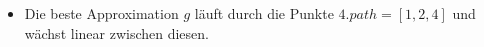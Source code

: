 \documentclass[a4paper]{scrartcl}
\begin{document}
\begin{enumerate}[(a)]
\begin{itemize}
\begin{itemize}
                \end{itemize}

            \item Die beste Approximation $g$ läuft durch die Punkte
                $4.path = [1, 2, 4]$ und wächst linear zwischen diesen.
                
        \end{itemize}

\end{enumerate}
\end{document}

